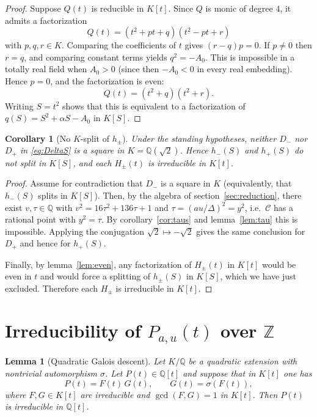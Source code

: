 \documentclass[12pt]{article}
\newtheorem{lemma}{Lemma}
\newtheorem{corollary}{Corollary}
\theoremstyle{remark}
\theoremstyle{definition}
\begin{document}
\begin{proof}
Suppose $Q(t)$ is reducible in $K[t]$. Since $Q$ is monic of degree $4$, it admits a factorization
\[
Q(t)=(t^2+pt+q)(t^2-p t+r)
\]
with $p,q,r\in K$. Comparing the coefficients of $t$ gives $(r-q)p=0$.
If $p\neq 0$ then $r=q$, and comparing constant terms yields $q^2=-A_0$.
This is impossible in a totally real field when $A_0>0$ (since then $-A_0<0$ in every real embedding).
Hence $p=0$, and the factorization is even:
\[
Q(t)=(t^2+q)(t^2+r).
\]
Writing $S=t^2$ shows that this is equivalent to a factorization of $q(S)=S^2+\alpha S-A_0$ in $K[S]$.
\end{proof}

\begin{corollary}[No $K$-split of $h_\pm$]\label{cor:noKsplit}
Under the standing hypotheses, neither $D_-$ nor $D_+$ in \eqref{eq:DeltaS} is a square in $K=\mathbb{Q}(\sqrt2)$. Hence $h_-(S)$ and $h_+(S)$ do not split in $K[S]$, and each $H_\pm(t)$ is irreducible in $K[t]$.
\end{corollary}

\begin{proof}
Assume for contradiction that $D_-$ is a square in $K$ (equivalently, that $h_-(S)$ splits in $K[S]$). Then, by the algebra of section~\ref{sec:reduction}, there exist $v,\tau\in\mathbb{Q}$ with $v^2=16\tau^2+136\tau+1$ and $\tau=(au/\Delta)^2=y^2$, i.e.\ $\mathcal{C}$ has a rational point with $y^2=\tau$. By corollary~\ref{cor:taus} and lemma~\ref{lem:tau} this is impossible. Applying the conjugation $\sqrt2\mapsto-\sqrt2$ gives the same conclusion for $D_+$ and hence for $h_+(S)$.

Finally, by lemma~\ref{lem:even}, any factorization of $H_\pm(t)$ in $K[t]$ would be even in $t$ and would force a splitting of $h_\pm(S)$ in $K[S]$, which we have just excluded. Therefore each $H_\pm$ is irreducible in $K[t]$.
\end{proof}


\section{Irreducibility of $P_{a,u}(t)$ over $\mathbb{Z}$}\label{sec:final}

\begin{lemma}[Quadratic Galois descent]\label{lem:descent}
Let $K/\mathbb{Q}$ be a quadratic extension with nontrivial automorphism $\sigma$.
Let $P(t)\in\mathbb{Q}[t]$ and suppose that in $K[t]$ one has
\[
P(t)=F(t)\,G(t),\qquad G(t)=\sigma(F(t)),
\]
where $F,G\in K[t]$ are irreducible and $\gcd(F,G)=1$ in $K[t]$.
Then $P(t)$ is irreducible in $\mathbb{Q}[t]$.
\end{lemma}
\end{document}
